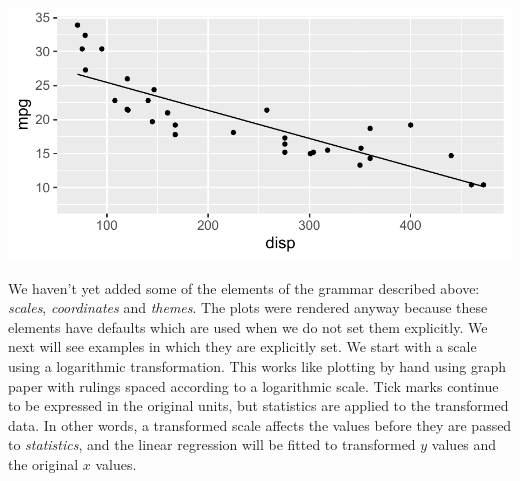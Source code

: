 \documentclass[krantz2]{krantz}\usepackage{knitr}
\begin{document}
\begin{knitrout}\footnotesize
{}\color{fgcolor}\begin{kframe}
\begin{alltt}
\hlstd{(} 
       \hlstd{(}    \hlopt{+}
  \hlstd{()} \hlopt{+}
  \hlstd{(} \hlstd{=} \hlstd{,}  \hlstd{=} \hlstd{,}   \hlopt{~} 
\end{alltt}
\end{kframe}

{\centering \includegraphics[width=.7\textwidth]{figure/pos-ggplot-basics-05-1} 

}


\end{knitrout}

We haven't yet added some of the elements of the grammar described above: \emph{scales}, \emph{coordinates} and \emph{themes}. The plots were rendered anyway because these elements have defaults which are used when we do not set them explicitly. We next will see examples in which they are explicitly set. We start with a scale using a logarithmic transformation. This works like plotting by hand using graph paper with rulings spaced according to a logarithmic scale. Tick marks continue to be expressed in the original units, but statistics are applied to the transformed data. In other words, a transformed scale affects the values before they are passed to \emph{statistics}, and the linear regression will be fitted to  transformed $y$ values and the original $x$ values.
\end{document}
